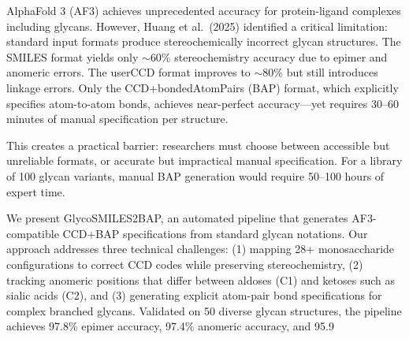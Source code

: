 \documentclass[11pt,a4paper]{article}
\begin{document}
AlphaFold 3 (AF3) achieves unprecedented accuracy for protein-ligand complexes including glycans. However, Huang et al.\ (2025) identified a critical limitation: standard input formats produce stereochemically incorrect glycan structures. The SMILES format yields only $\sim$60\% stereochemistry accuracy due to epimer and anomeric errors. The userCCD format improves to $\sim$80\% but still introduces linkage errors. Only the CCD+bondedAtomPairs (BAP) format, which explicitly specifies atom-to-atom bonds, achieves near-perfect accuracy---yet requires 30--60 minutes of manual specification per structure.

This creates a practical barrier: researchers must choose between accessible but unreliable formats, or accurate but impractical manual specification. For a library of 100 glycan variants, manual BAP generation would require 50--100 hours of expert time.

We present GlycoSMILES2BAP, an automated pipeline that generates AF3-compatible CCD+BAP specifications from standard glycan notations. Our approach addresses three technical challenges: (1) mapping 28+ monosaccharide configurations to correct CCD codes while preserving stereochemistry, (2) tracking anomeric positions that differ between aldoses (C1) and ketoses such as sialic acids (C2), and (3) generating explicit atom-pair bond specifications for complex branched glycans. Validated on 50 diverse glycan structures, the pipeline achieves 97.8\% epimer accuracy, 97.4\% anomeric accuracy, and 95.9\
\end{document}
